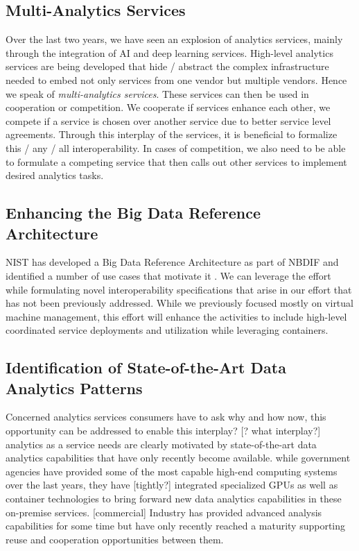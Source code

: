\subsection{Multi-Analytics Services}

Over the last two years, we have seen an explosion of analytics
services, mainly through the integration of AI and deep learning
services. High-level analytics services are being developed that hide / abstract the
complex infrastructure needed to embed not only services from one
vendor but multiple vendors. Hence we speak of {\em multi-analytics
  services}. These services can then be used in cooperation or
competition. We cooperate if services enhance each other, we compete
if a service is chosen over another service due to better service
level agreements. Through this interplay of the services, it is
beneficial to formalize this / any / all interoperability. In cases of competition,
we also need to be able to formulate a competing service that then
calls out other services to implement desired analytics tasks.

\subsection{Enhancing the Big Data Reference Architecture}
\label{s:arch}

NIST has developed a Big Data Reference Architecture as part of
NBDIF\cite{nist-v6} and identified a number of use cases that motivate
it \cite{nist-v3}. We can leverage the effort
~\cite{nist-v1,nist-v2,nist-v3,nist-v4,nist-v5,nist-v6,nist-v7,nist-v8,nist-v9}
while formulating novel interoperability specifications that arise in
our effort that has not been previously addressed. While we previously focused
mostly on virtual machine management, this effort will enhance the
activities to include high-level coordinated service deployments and
utilization while leveraging containers.

\subsection{Identification of State-of-the-Art Data Analytics Patterns}

Concerned analytics services consumers have to ask why and how now, 
this opportunity can be addressed to enable this interplay? [? what interplay?] 
analytics as a service needs are clearly motivated by state-of-the-art data
analytics capabilities that have only recently become available.
while government agencies have provided some of the most capable
high-end computing systems over the last years, they have [tightly?] integrated
specialized GPUs as well as container technologies to bring forward
new data analytics capabilities in these on-premise services. [commercial] Industry
has provided advanced analysis capabilities for some time but have only
recently reached a maturity supporting reuse and
cooperation opportunities between them. 

